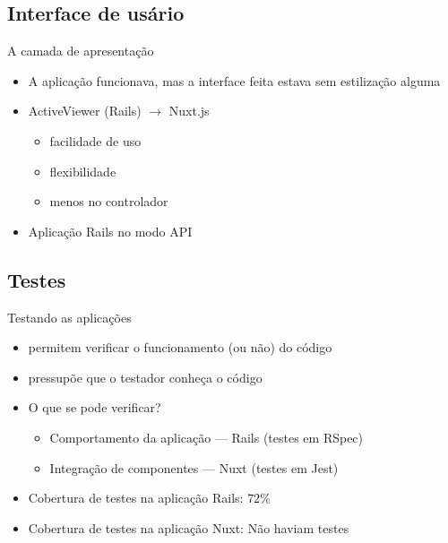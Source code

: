 \documentclass[aspectratio=43,display]{beamer}
\begin{document}
  \subsection{Interface de usário}\label{subsec:interface}

  \begin{frame}{A camada de apresentação}
    \begin{itemize}
      \item A aplicação funcionava, mas a interface feita estava sem estilização alguma \pause
      \item ActiveViewer (Rails) $\rightarrow $ Nuxt.js %
      \begin{itemize}
        \item facilidade de uso \pause
        \item flexibilidade  \pause %
        \item menos  no controlador \pause
      \end{itemize}
      \item Aplicação Rails no modo API
    \end{itemize}
  \end{frame}

  \subsection{Testes}\label{subsec:testes}

  \begin{frame}{Testando as aplicações}
    \begin{itemize}
      \item permitem verificar o funcionamento (ou não) do código \pause
      \item pressupõe que o testador conheça o código \pause %
      \item O que se pode verificar?
      \begin{itemize}
        \item Comportamento da aplicação --- Rails (testes em RSpec) \pause %
        \item Integração de componentes --- Nuxt (testes em Jest) \pause %
      \end{itemize}
      \item Cobertura de testes na aplicação Rails: $72\%$ \pause %
      \item Cobertura de testes na aplicação Nuxt: Não haviam testes  %
    \end{itemize}
  \end{frame}
\end{document}
